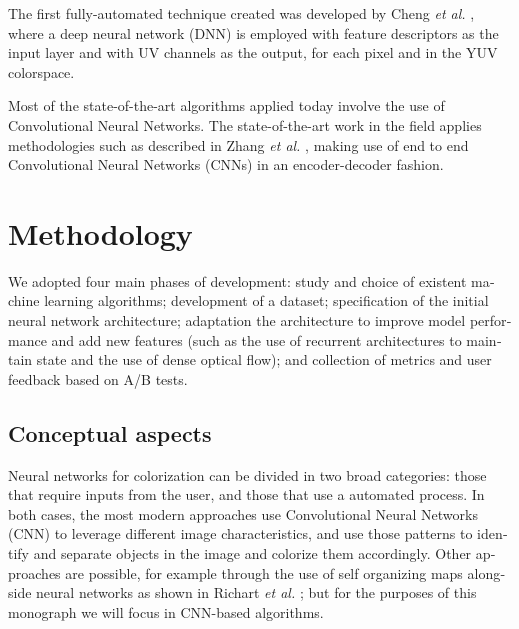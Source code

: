 \documentclass[12pt,openright,twoside,a4paper,english]{abntex2}
\begin{document}
\begin{otherlanguage}{english}
The first fully-automated technique created was developed by Cheng \textit{et al.} \cite{Cheng2015},
where a deep neural network (DNN) is employed with feature descriptors as the input layer and with UV channels as the output, for each pixel and in the YUV colorspace.


Most of the state-of-the-art algorithms applied today involve the use of Convolutional Neural Networks. The state-of-the-art work in the field applies methodologies such as described in Zhang \textit{et al.} \cite{colorful}, making use of end to end Convolutional Neural Networks (CNNs) in an encoder-decoder fashion.







\chapter{Methodology}

We adopted four main phases of development: study and choice of existent machine learning algorithms; development of a dataset; specification of the initial neural network architecture; adaptation the architecture to improve model performance and add new features (such as the use of recurrent architectures to maintain state and the use of dense optical flow); and collection of metrics and user feedback based on A/B tests.

\section{Conceptual aspects} \label{sec:Concept}
Neural networks for colorization can be divided in two broad categories: those that require inputs from the user, and those that use a automated process. In both cases, the most modern approaches use Convolutional Neural Networks (CNN) to leverage different image characteristics, and use those patterns to identify and separate objects in the image and colorize them accordingly. Other approaches are possible, for example through the use of self organizing maps alongside neural networks as shown in Richart \textit{et al.} \cite{Richart_som_nn}; but for the purposes of this monograph we will focus in CNN-based algorithms.


\end{otherlanguage}
\end{document}
